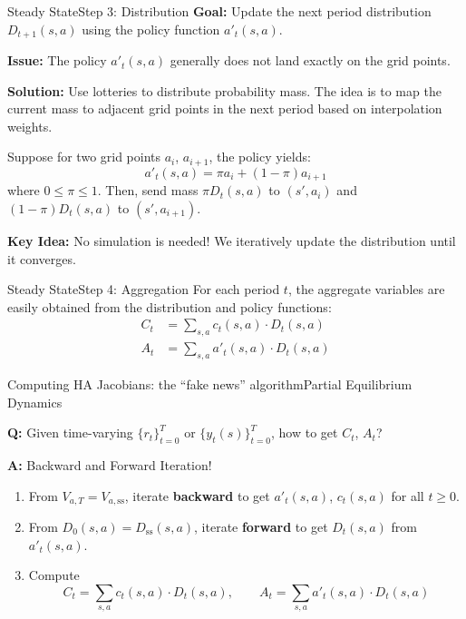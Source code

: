 \documentclass[aspectratio=169]{beamer}
\begin{document}
\begin{frame}{Steady State}{Step 3: Distribution}
    \textbf{Goal:} Update the next period distribution $D_{t+1}(s, a)$ using the policy function $a'_t(s, a)$.

    \textbf{Issue:} The policy $a'_t(s, a)$ generally \alert{does not land exactly on the grid points}.


    \vspace{0.5em}


    \textbf{Solution:} Use \alert{lotteries} to distribute probability mass. The idea is to map the current mass to adjacent grid points in the next period based on interpolation weights.


    \vspace{0.5em}

    Suppose for two grid points $a_i$, $a_{i+1}$, the policy yields:
    \[
        a'_t(s, a) = \pi a_i + (1 - \pi) a_{i+1}
    \]
    where $0 \leq \pi \leq 1$. Then, send mass $\pi D_t(s, a)$ to $(s', a_i)$ and $(1 - \pi) D_t(s, a)$ to $(s', a_{i+1})$.


    \vspace{0.5em}

    \textbf{Key Idea:} No simulation is needed! We iteratively update the distribution until it converges.

\end{frame}

\begin{frame}{Steady State}{Step 4: Aggregation}
    For each period $t$, the aggregate variables are easily obtained from the distribution and policy functions:
    \begin{align*}
        C_t &= \sum_{s,a} c_t(s, a) \cdot D_t(s, a) \\
        A_t &= \sum_{s,a} a'_t(s, a) \cdot D_t(s, a)
    \end{align*}
\end{frame}



\begin{frame}{Computing HA Jacobians: the “fake news” algorithm}{Partial Equilibrium Dynamics}

    \textbf{Q:} Given time-varying $\{r_t\}_{t=0}^T$ or $\{y_t(s)\}_{t=0}^T$, how to get $C_t$, $A_t$?


    \vspace{0.5em}

    \textbf{A:} Backward and Forward Iteration!
    \begin{enumerate}
        \item From $V_{a,T} = V_{a,\mathrm{ss}}$, iterate \textbf{backward} to get $a'_t(s,a)$, $c_t(s,a)$ for all $t \geq 0$.
        \item From $D_0(s,a) = D_{\mathrm{ss}}(s,a)$, iterate \textbf{forward} to get $D_t(s,a)$ from $a'_t(s,a)$.
        \item Compute
        \[
            C_t = \sum_{s,a} c_t(s,a) \cdot D_t(s,a), \qquad
            A_t = \sum_{s,a} a'_t(s,a) \cdot D_t(s,a)
        \]
    \end{enumerate}

\end{frame}
\end{document}
